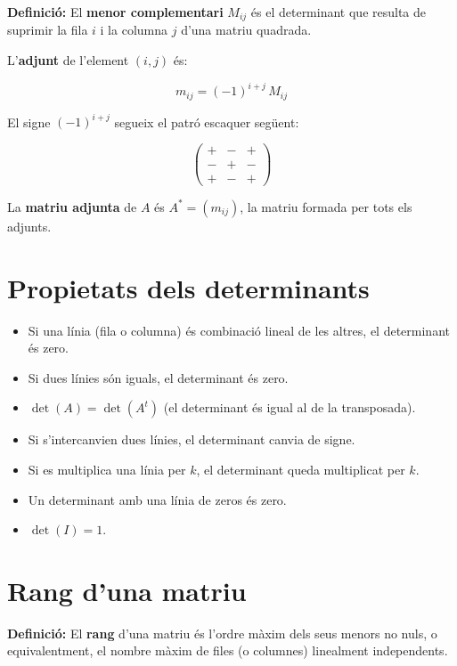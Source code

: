 \textbf{Definició:} El \textbf{menor complementari} $M_{ij}$ és el determinant que resulta de suprimir la fila $i$ i la columna $j$ d'una matriu quadrada.

L'\textbf{adjunt} de l'element $(i, j)$ és:

\begin{equation*}
m_{ij} = (-1)^{i+j}\,M_{ij}
\end{equation*}

El signe $(-1)^{i+j}$ segueix el patró escaquer següent:

\begin{equation*}
\begin{pmatrix} + & - & + \\ - & + & - \\ + & - & + \end{pmatrix}
\end{equation*}

La \textbf{matriu adjunta} de $A$ és $A^* = (m_{ij})$, la matriu formada per tots els adjunts.

\section{Propietats dels determinants}

\begin{itemize}
\item Si una línia (fila o columna) és combinació lineal de les altres, el determinant és zero.
\item Si dues línies són iguals, el determinant és zero.
\item $\det(A) = \det(A^t)$ (el determinant és igual al de la transposada).
\item Si s'intercanvien dues línies, el determinant canvia de signe.
\item Si es multiplica una línia per $k$, el determinant queda multiplicat per $k$.
\item Un determinant amb una línia de zeros és zero.
\item $\det(I) = 1$.
\end{itemize}

\section{Rang d'una matriu}

\textbf{Definició:} El \textbf{rang} d'una matriu és l'ordre màxim dels seus menors no nuls, o equivalentment, el nombre màxim de files (o columnes) linealment independents.

